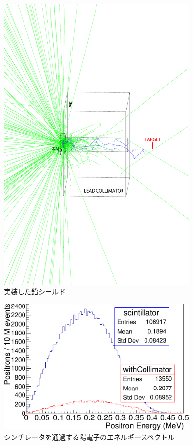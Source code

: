\begin{figure}[!tbp]
	\centering
		\includegraphics[width=10cm]{img/test1b_geometry.pdf}
	\caption{実装した鉛シールド}
	\label{test1b_geometry}
\end{figure}

\begin{figure}[!tbp]
	\centering
		\includegraphics[width=10cm]{fig/collimator_loss.pdf}
	\caption{シンチレータを通過する陽電子のエネルギースペクトル}
	\label{collimator_loss}
\end{figure}

